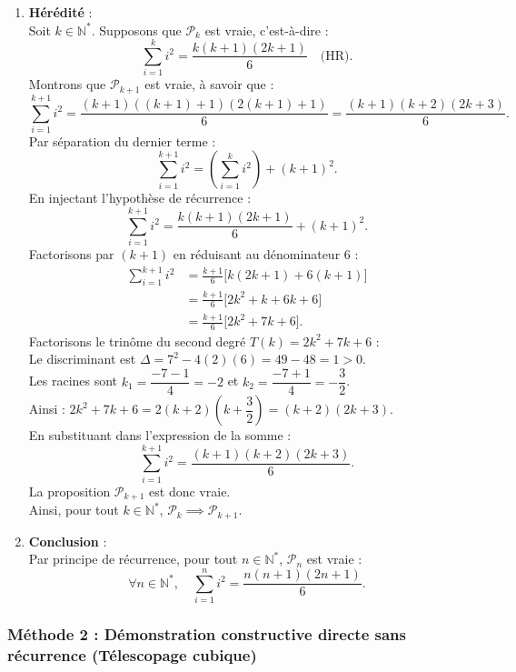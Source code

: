 \documentclass[11pt,a4paper]{article}
\newcommand{\N}{\mathbb{N}}
\begin{document}
\begin{correctionbox}
\begin{enumerate}[label=\textbf{\arabic*.}]
    \item \textbf{Hérédité} :\\
    Soit $k \in \N^*$. Supposons que $\mathcal{P}_k$ est vraie, c'est-à-dire :
    \[
    \sum_{i=1}^k i^2 = \frac{k(k+1)(2k+1)}{6} \quad \text{(HR)}.
    \]
    Montrons que $\mathcal{P}_{k+1}$ est vraie, à savoir que :
    \[
    \sum_{i=1}^{k+1} i^2 = \frac{(k+1)((k+1)+1)(2(k+1)+1)}{6} = \frac{(k+1)(k+2)(2k+3)}{6}.
    \]
    Par séparation du dernier terme :
    \[
    \sum_{i=1}^{k+1} i^2 = \left(\sum_{i=1}^k i^2\right) + (k+1)^2.
    \]
    En injectant l'hypothèse de récurrence :
    \[
    \sum_{i=1}^{k+1} i^2 = \frac{k(k+1)(2k+1)}{6} + (k+1)^2.
    \]
    Factorisons par $(k+1)$ en réduisant au dénominateur $6$ :
    \begin{align*}
    \sum_{i=1}^{k+1} i^2 &= \frac{k+1}{6} \Big[ k(2k+1) + 6(k+1) \Big] \\
                         &= \frac{k+1}{6} \Big[ 2k^2 + k + 6k + 6 \Big] \\
                         &= \frac{k+1}{6} \Big[ 2k^2 + 7k + 6 \Big].
    \end{align*}
    Factorisons le trinôme du second degré $T(k) = 2k^2 + 7k + 6$ :\\
    Le discriminant est $\Delta = 7^2 - 4(2)(6) = 49 - 48 = 1 > 0$.\\
    Les racines sont $k_1 = \dfrac{-7 - 1}{4} = -2$ et $k_2 = \dfrac{-7 + 1}{4} = -\dfrac{3}{2}$.\\
    Ainsi : $2k^2 + 7k + 6 = 2(k+2)\left(k + \dfrac{3}{2}\right) = (k+2)(2k+3)$.\\
    En substituant dans l'expression de la somme :
    \[
    \sum_{i=1}^{k+1} i^2 = \frac{(k+1)(k+2)(2k+3)}{6}.
    \]
    La proposition $\mathcal{P}_{k+1}$ est donc vraie.\\
    Ainsi, pour tout $k \in \N^*$, $\mathcal{P}_k \implies \mathcal{P}_{k+1}$.

    \item \textbf{Conclusion} :\\
    Par principe de récurrence, pour tout $n \in \N^*$, $\mathcal{P}_n$ est vraie :
    \[
    \forall n \in \N^*, \quad \sum_{i=1}^n i^2 = \frac{n(n+1)(2n+1)}{6}.
    \]
\end{enumerate}

\subsubsection*{Méthode 2 : Démonstration constructive directe sans récurrence (Télescopage cubique)}


\end{correctionbox}
\end{document}
